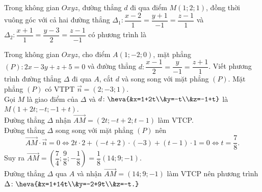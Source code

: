 \begin{bt}%
	Trong không gian $Oxyz$, đường thẳng $d$ đi qua điểm $M(1; 2; 1)$, đồng thời vuông góc với cả hai đường thẳng $\Delta_{1}\colon \dfrac{x-2}{1}=\dfrac{y+1}{-1}=\dfrac{z-1}{1}$ và $\Delta_{2}\colon \dfrac{x+1}{1}=\dfrac{y-3}{2}=\dfrac{z-1}{-1}$ có phương trình là
\end{bt}

\begin{bt}%
	Trong không gian $Oxyz$, cho điểm $A(1;-2;0)$, mặt phẳng $(P)\colon 2x-3y+z+5=0$ và đường thẳng $d\colon \dfrac{x-1}{2}=\dfrac{y}{-1}=\dfrac{z+1}{1}$. Viết phương trình đường thẳng $\Delta$ đi qua $A$, cắt $d$ và song song với mặt phẳng $(P)$.
	\loigiai
	{
		Mặt phẳng $(P)$ có VTPT $\overrightarrow{n}=(2 ;-3 ; 1)$.\\
		Gọi $M$ là giao điểm của $\Delta$ và $d\colon \heva{&x=1+2t\\&y=-t\\&z=-1+t}$ là $M(1+2t ;-t ;-1+t)$.\\
		Đường thẳng $\Delta$ nhận $\overrightarrow{AM}=(2 t ;-t+2 ; t-1)$ làm VTCP.\\
		Đường thẳng $\Delta$ song song với mặt phẳng $(P)$ nên
		$$\overrightarrow{AM} \cdot \overrightarrow{n}=0 \Leftrightarrow 2t \cdot 2+(-t+2)\cdot(-3)+(t-1) \cdot 1=0 \Leftrightarrow t=\dfrac{7}{8}.$$
		Suy ra $\overrightarrow{AM}=\left(\dfrac{7}{4} ; \dfrac{9}{8} ;-\dfrac{1}{8}\right)=\dfrac{1}{8}(14 ; 9 ;-1)$.\\
		Đường thẳng $\Delta$ qua $A$ và nhận $\overrightarrow{AM}=(14 ; 9 ;-1)$ làm VTCP nên phương trình $\Delta\colon \heva{&x=1+14t\\&y=-2+9t\\&z=-t.}$	
	}
\end{bt}

